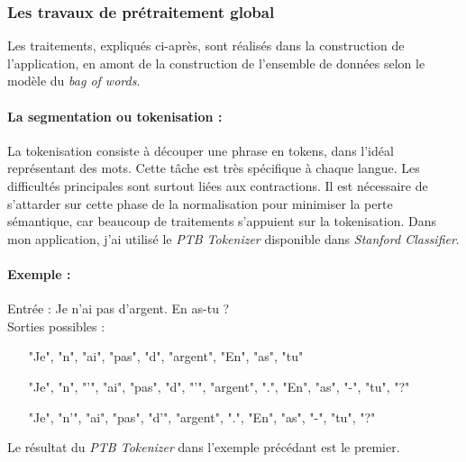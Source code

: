             \subsubsection{Les travaux de prétraitement global}
            \label{ssubsec:travaux_globaux}
                Les traitements, expliqués ci-après, sont réalisés dans la construction de l'application, en amont de la construction de l'ensemble de données selon le modèle du \textit{bag of words}.

                \paragraph{La segmentation ou tokenisation :}
                    La tokenisation consiste à découper une phrase en tokens, dans l'idéal représentant des mots. Cette tâche est très spécifique à chaque langue. Les difficultés principales sont surtout liées aux contractions. Il est nécessaire de s'attarder sur cette phase de la normalisation pour minimiser la perte sémantique, car beaucoup de traitements s'appuient sur la tokenisation. Dans mon application, j'ai utilisé le \textit{PTB Tokenizer} disponible dans \textit{Stanford Classifier}.

                    \paragraph{Exemple :}
                    Entrée : \og Je n'ai pas d'argent. En as-tu ? \fg\\
                    Sorties possibles :
                    \begin{itemize}
                        \item ["Je", "n", "ai", "pas", "d", "argent", "En", "as", "tu"]
                        \item ["Je", "n", "'", "ai", "pas", "d", "'", "argent", ".", "En", "as", "-", "tu", "?"]
                        \item ["Je", "n'", "ai", "pas", "d'", "argent", ".", "En", "as", "-", "tu", "?"]
                    \end{itemize}
                    Le résultat du \textit{PTB Tokenizer} dans l'exemple précédant est le premier.

